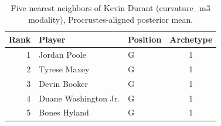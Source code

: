 \begin{table}[htbp]
  \centering\small
  \begin{tabular}{rllc}
    \toprule
    Rank & Player & Position & Archetype \\
    \midrule
    1 & Jordan Poole & G & 1 \\
    2 & Tyrese Maxey & G & 1 \\
    3 & Devin Booker & G & 1 \\
    4 & Duane Washington Jr. & G & 1 \\
    5 & Bones Hyland & G & 1 \\
    \bottomrule
  \end{tabular}
  \caption{Five nearest neighbors of Kevin Durant (curvature_m3 modality), Procrustes-aligned posterior mean.}
  \label{tab:Kevin_Durant_neighbors_curvature_m3}
\end{table}

